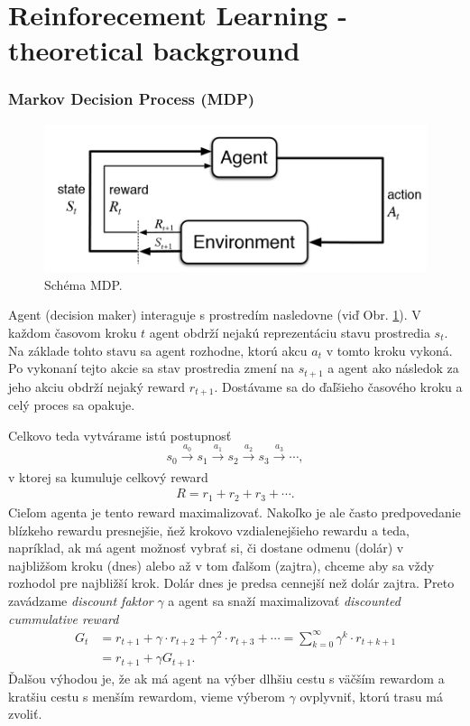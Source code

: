 \documentclass[letterpaper,12pt]{article}
\begin{document}
\section{Reinforecement Learning - theoretical background}
\subsubsection*{Markov Decision Process (MDP)}
\begin{figure}[H]
\centering
\includegraphics[width=12cm]{images/rl-diagram.png}
\caption{Schéma MDP.}
\label{rl-diagram}
\end{figure}

\indent\par Agent (decision maker) interaguje s prostredím nasledovne (viď Obr. \ref{rl-diagram}). V každom časovom kroku $t$ agent obdrží nejakú reprezentáciu stavu prostredia $s_t$. Na základe tohto stavu sa agent rozhodne, ktorú akcu $a_t$ v tomto kroku vykoná. Po vykonaní tejto akcie sa stav prostredia zmení na $s_{t+1}$ a agent ako následok za jeho akciu obdrží nejaký reward $r_{t+1}$. Dostávame sa do ďaľšieho časového kroku a celý proces sa opakuje.

Celkovo teda vytvárame istú postupnosť
$$s_0 \xrightarrow[]{a_0} s_1 \xrightarrow[]{a_1} s_2 \xrightarrow[]{a_2} s_3 \xrightarrow[]{a_3} \cdots,$$
v ktorej sa kumuluje celkový reward
\begin{align*}
R = r_{1} + r_{2} + r_3 + \cdots.
\end{align*}
Cieľom agenta je tento reward maximalizovať. Nakoľko je ale často predpovedanie blízkeho rewardu presnejšie, ňež krokovo vzdialenejšieho rewardu a teda, napríklad, ak má agent možnosť vybrať si, či dostane odmenu (dolár) v najbližšom kroku (dnes) alebo až v tom ďalšom (zajtra), chceme aby sa vždy rozhodol pre najbližší krok. Dolár dnes je predsa cennejší než dolár zajtra. Preto zavádzame \textit{discount faktor} $\gamma$ a agent sa snaží maximalizovať \textit{discounted cummulative reward}
\begin{align*}
G_t &= r_{t+1} + \gamma \cdot r_{t+2} + \gamma^2 \cdot r_{t+3} + \cdots = \sum\limits_{k=0}^\infty \gamma^k \cdot r_{t+k+1}\\
	&= r_{t+1} + \gamma G_{t+1}.
\end{align*}
Ďalšou výhodou je, že ak má agent na výber dlhšiu cestu s väčším rewardom a kratšiu cestu s menším rewardom, vieme výberom $\gamma$ ovplyvniť, ktorú trasu má zvoliť. 
\end{document}
